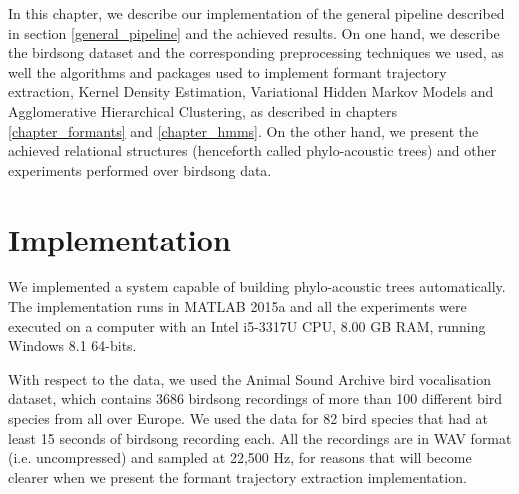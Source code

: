 \documentclass[../main.tex]{subfiles}
\begin{document}
 \label{chapter_account}
In this chapter, we describe our implementation of the general pipeline described in section \ref{general_pipeline} and the achieved results. On one hand, we describe the birdsong dataset and the corresponding preprocessing techniques we used, as well the algorithms and packages used to implement formant trajectory extraction, Kernel Density Estimation, Variational Hidden Markov Models and Agglomerative Hierarchical Clustering, as described in chapters \ref{chapter_formants} and \ref{chapter_hmms}. On the other hand, we present the achieved relational structures (henceforth called phylo-acoustic trees) and other experiments performed over birdsong data.

\section{Implementation}
We implemented a system capable of building phylo-acoustic trees automatically. The implementation runs in MATLAB 2015a and all the experiments were executed on a computer with an Intel i5-3317U CPU, 8.00 GB RAM, running Windows 8.1 64-bits. 
\par With respect to the data, we used the Animal Sound Archive bird vocalisation dataset, which contains 3686 birdsong recordings of more than 100 different bird species from all over Europe. We used the data for 82 bird species that had at least 15 seconds of birdsong recording each. All the recordings are in WAV format (i.e. uncompressed) and sampled at 22,500 Hz, for reasons that will become clearer when we present the formant trajectory extraction implementation. 
\end{document}
